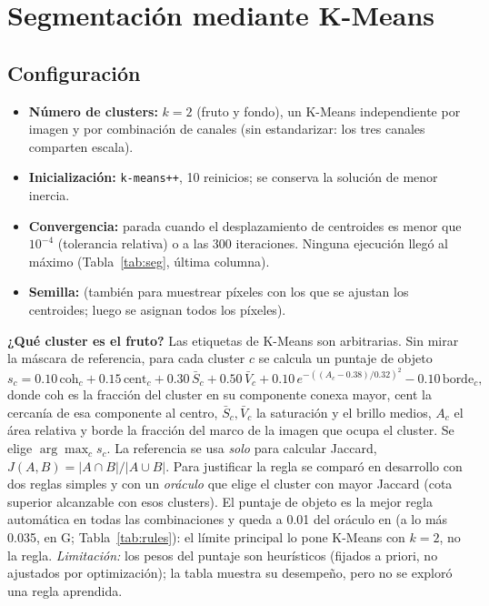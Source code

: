 \documentclass[11pt,a4paper]{article}
\begin{document}
\section{Segmentación mediante K-Means}

\subsection{Configuración}

\begin{itemize}[leftmargin=1.4em,itemsep=1pt]
\item \textbf{Número de clusters:} $k=2$ (fruto y fondo), un K-Means independiente por
imagen y por combinación de canales (sin estandarizar: los tres canales comparten escala).
\item \textbf{Inicialización:} \texttt{k-means++}, 10 reinicios; se conserva la solución de
menor inercia.
\item \textbf{Convergencia:} parada cuando el desplazamiento de centroides es menor que
$10^{-4}$ (tolerancia relativa) o a las 300 iteraciones. Ninguna ejecución llegó al
máximo (Tabla~\ref{tab:seg}, última columna).
\item \textbf{Semilla:} \Seed{} (también para muestrear \PixelSample{} píxeles con los que se
ajustan los centroides; luego se asignan todos los píxeles).
\end{itemize}

\textbf{¿Qué cluster es el fruto?} Las etiquetas de K-Means son arbitrarias. Sin mirar la
máscara de referencia, para cada cluster $c$ se calcula un puntaje de objeto
\[
s_c = 0.10\,\text{coh}_c + 0.15\,\text{cent}_c + 0.30\,\bar S_c + 0.50\,\bar V_c
      + 0.10\,e^{-((A_c-0.38)/0.32)^2} - 0.10\,\text{borde}_c ,
\]
donde coh es la fracción del cluster en su componente conexa mayor, cent la cercanía de
esa componente al centro, $\bar S_c,\bar V_c$ la saturación y el brillo medios, $A_c$ el área
relativa y borde la fracción del marco de la imagen que ocupa el cluster. Se elige
$\arg\max_c s_c$. La referencia se usa \emph{solo} para calcular Jaccard,
$J(A,B)=|A\cap B|/|A\cup B|$. Para justificar la regla se comparó en desarrollo con dos reglas
simples y con un \emph{oráculo} que elige el cluster con mayor Jaccard (cota superior
alcanzable con esos clusters). El puntaje de objeto es la mejor regla automática en todas
las combinaciones y queda a 0.01 del oráculo en \BestCombo{} (a lo más 0.035, en G;
Tabla~\ref{tab:rules}): el límite principal lo pone K-Means con $k=2$, no la regla.
\emph{Limitación:} los pesos del puntaje son heurísticos (fijados a priori, no ajustados por
optimización); la tabla muestra su desempeño, pero no se exploró una regla aprendida.
\end{document}

